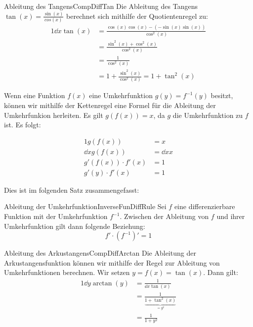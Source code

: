 \begin{example}{Ableitung des Tangens}{CompDiffTan}
    Die Ableitung des Tangens $\tan(x) = \frac{\sin(x)}{cos(x)}$ berechnet sich mithilfe der Quotientenregel zu:
    \begin{alignat*}{1}
        \dd{}{x} \tan(x) &= \frac{\cos(x)\cos(x)-(-\sin(x)\sin(x))}{\cos^2(x)} \\
                         &= \frac{\sin^2(x) + \cos^2(x)}{\cos^2(x)} \\
                         &= \frac{1}{\cos^2(x)} \\
                         &= 1+\frac{\sin^2(x)}{\cos^2(x)} = 1 + \tan^2(x)
    \end{alignat*}
\end{example}

Wenn eine Funktion $f(x)$ eine Umkehrfunktion $g(y) = f^{-1}(y)$ besitzt, können wir mithilfe der Kettenregel eine Formel für die Ableitung der Umkehrfunkion herleiten. Es gilt $g(f(x)) = x$, da $g$ die Umkehrfunktion zu $f$ ist. Es folgt:

\begin{alignat*}{1}
    g(f(x)) &= x \\
    \dd{}{x} g(f(x)) &= \dd{}{x} x \\
    g'(f(x)) \cdot f'(x) &= 1 \\
    g'(y) \cdot f'(x) &= 1
\end{alignat*}

Dies ist im folgenden Satz zusammengefasst:

\begin{statement}{Ableitung der Umkehrfunktion}{InverseFunDiffRule}
    Sei $f$ eine differenzierbare Funktion mit der Umkehrfunktion $f^{-1}$. Zwischen der Ableitung von $f$ und ihrer Umkehrfunktion gilt dann folgende Beziehung:
    $$
        f' \cdot (f^{-1})' = 1
    $$
\end{statement}

\begin{example}{Ableitung des Arkustangens}{CompDiffArctan}
    Die Ableitung der Arkustangensfunktion können wir mithilfe der Regel zur Ableitung von Umkehrfunktionen berechnen. Wir setzen $y = f(x) = \tan(x)$. Dann gilt:
    \begin{alignat*}{1}
        \dd{}{y} \arctan(y) &= \frac{1}{\dd{}{x} \tan(x)} \\
                            &= \frac{1}{\underbrace{1+\tan^2(x)}_{=y^2}} \\
                            &= \frac{1}{1+y^2}
    \end{alignat*}
\end{example}

